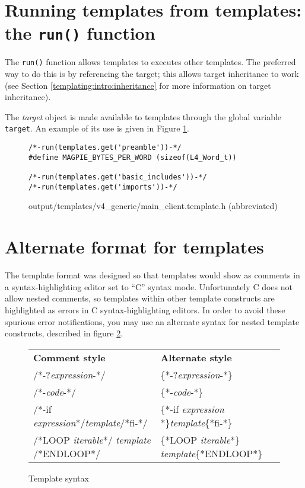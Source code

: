 \section{Running templates from templates: the {\tt run()} function}
\label{templating:run_fn}
The {\tt run()} function allows templates to executes other templates. The preferred way to do this is by referencing the target; this allows target inheritance to work (see Section \ref{templating:intro:inheritance} for more information on target inheritance).

The {\em target} object is made available to templates through the global variable {\tt target}. An example of its use is given in Figure \ref{fig:templating:runfn}.

\begin{figure}
\begin{verbatim}
/*-run(templates.get('preamble'))-*/
#define MAGPIE_BYTES_PER_WORD (sizeof(L4_Word_t))

/*-run(templates.get('basic_includes'))-*/
/*-run(templates.get('imports'))-*/
\end{verbatim}
\caption{output/templates/v4\_generic/main\_client.template.h (abbreviated)}
\label{fig:templating:runfn}
\end{figure}



\section{Alternate format for templates}
The template format was designed so that templates would show as comments in a syntax-highlighting editor set to ``C'' syntax mode. Unfortunately C does not allow nested comments, so templates within other template constructs are highlighted as errors in C syntax-highlighting editors. In order to avoid these spurious error notifications, you may use an alternate syntax for nested template constructs, described in figure \ref{fig:templating:syntaxsummary}.

\begin{figure}
\begin{tabularx}{\textwidth}{ll}
\textbf{Comment style}&\textbf{Alternate style}\\
/*-?\textit{expression}-*/ & \{*-?\textit{expression}-*\}\\
/*-\textit{code}-*/ & \{*-\textit{code}-*\}\\
/*-if \textit{expression}*/\textit{template}/*fi-*/ & \{*-if \textit{expression} *\}\textit{template}\{*fi-*\}\\
/*LOOP \textit{iterable}*/\newline
\textit{template}\newline
/*ENDLOOP*/
& \{*LOOP \textit{iterable}*\}\newline
\textit{template}\newline\{*ENDLOOP*\}\\
\end{tabularx}
\caption{Template syntax}
\label{fig:templating:syntaxsummary}
\end{figure}

